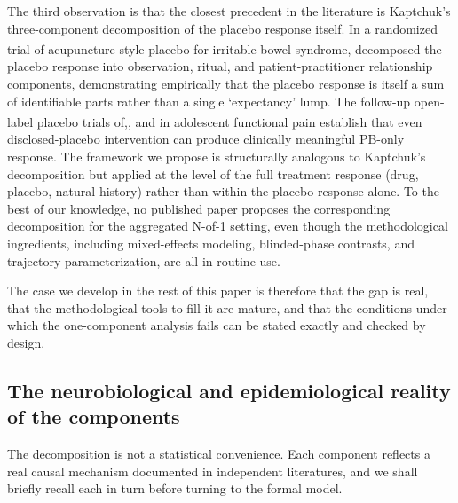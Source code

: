 \documentclass[
  11pt,
]{article}
\begin{document}
The third observation is that the closest precedent in the literature is
Kaptchuk's three-component decomposition of the placebo response itself. In a
randomized trial of acupuncture-style placebo for irritable bowel syndrome,\textsuperscript{} decomposed the placebo response into observation,
ritual, and patient-practitioner relationship components, demonstrating
empirically that the placebo response is itself a sum of identifiable parts
rather than a single `expectancy' lump. The follow-up open-label placebo
trials of\textsuperscript{},\textsuperscript{}, and\textsuperscript{} in adolescent
functional pain establish that even disclosed-placebo intervention can produce
clinically meaningful PB-only response. The framework we propose is
structurally analogous to Kaptchuk's decomposition but applied at the level of
the full treatment response (drug, placebo, natural history) rather than
within the placebo response alone. To the best of our knowledge, no published
paper proposes the corresponding decomposition for the aggregated N-of-1
setting, even though the methodological ingredients, including mixed-effects
modeling, blinded-phase contrasts, and trajectory parameterization, are all in
routine use.

The case we develop in the rest of this paper is therefore that the gap is
real, that the methodological tools to fill it are mature, and that the
conditions under which the one-component analysis fails can be stated
exactly and checked by design.

\subsection{The neurobiological and epidemiological reality of the components}\label{the-neurobiological-and-epidemiological-reality-of-the-components}

The decomposition is not a statistical convenience. Each component reflects a
real causal mechanism documented in independent literatures, and we shall
briefly recall each in turn before turning to the formal model.
\end{document}
